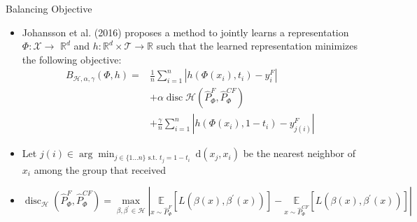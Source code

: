 \documentclass{beamer}
\begin{document}
	\begin{frame}{Balancing Objective}
		\begin{itemize}
			\item Johansson et al. (2016) proposes a method to jointly learns a representation $\Phi: \mathcal{X} \rightarrow$ $\mathbb{R}^{d}$ and $h: \mathbb{R}^{d} \times \mathcal{T} \rightarrow \mathbb{R}$ such that the learned representation minimizes the following objective:
			\begin{align*}
			B_{\mathcal{H}, \alpha, \gamma}(\Phi, h)=&\frac{1}{n} \sum_{i=1}^{n}\left|h\left(\Phi\left(x_{i}\right), t_{i}\right)-y_{i}^{F}\right|\\
			 &+ \alpha \operatorname{disc} \mathcal{H}\left(\hat{P}_{\Phi}^{F}, \hat{P}_{\Phi}^{C F}\right)\\
			 &+\frac{\gamma}{n} \sum_{i=1}^{n}\left|h\left(\Phi\left(x_{i}\right), 1-t_{i}\right)-y_{j(i)}^{F}\right|
			\end{align*}
			\item Let $j(i) \in \arg \min _{j \in\{1 \ldots n\} \text { s.t. } t_{j}=1-t_{i}} \mathrm{~d}\left(x_{j}, x_{i}\right)$ be the nearest neighbor of $x_{i}$ among the group that received
			\item $\operatorname{disc}_{\mathcal{H}}\left(\hat{P}_{\Phi}^{F}, \hat{P}_{\Phi}^{C F}\right) = \underset{{\beta, \beta^{\prime} \in \mathcal{H}}}{\max}\left|\underset{x \sim \hat{P}_{\Phi}^{F}}{\mathbb{E}}\left[L\left(\beta(x), \beta^{\prime}(x)\right)\right]-\underset{x \sim \hat{P}_{\Phi}^{C F}}{\mathbb{E}}\left[L\left(\beta(x), \beta^{\prime}(x)\right)\right]\right|$
			\end{itemize}
	\end{frame}
\end{document}
